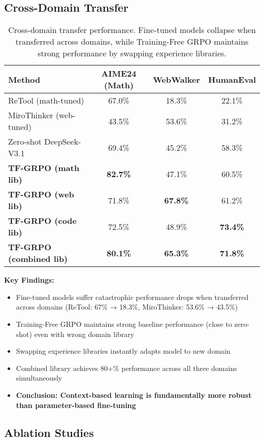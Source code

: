 \documentclass[11pt,a4paper]{article}
\begin{document}
\subsection{Cross-Domain Transfer}
\label{sec:transfer}

\begin{table}[h]
\centering
\caption{Cross-domain transfer performance. Fine-tuned models collapse when transferred across domains, while Training-Free GRPO maintains strong performance by swapping experience libraries.}
\label{tab:transfer}
\begin{tabular}{@{}lccc@{}}
\toprule
\textbf{Method} & \textbf{AIME24 (Math)} & \textbf{WebWalker} & \textbf{HumanEval} \\
\midrule
ReTool (math-tuned) & 67.0\% & 18.3\% & 22.1\% \\
MiroThinker (web-tuned) & 43.5\% & 53.6\% & 31.2\% \\
\midrule
Zero-shot DeepSeek-V3.1 & 69.4\% & 45.2\% & 58.3\% \\
\midrule
\textbf{TF-GRPO (math lib)} & \textbf{82.7\%} & 47.1\% & 60.5\% \\
\textbf{TF-GRPO (web lib)} & 71.8\% & \textbf{67.8\%} & 61.2\% \\
\textbf{TF-GRPO (code lib)} & 72.5\% & 48.9\% & \textbf{73.4\%} \\
\textbf{TF-GRPO (combined lib)} & \textbf{80.1\%} & \textbf{65.3\%} & \textbf{71.8\%} \\
\bottomrule
\end{tabular}
\end{table}

\textbf{Key Findings:}
\begin{itemize}
    \item Fine-tuned models suffer catastrophic performance drops when transferred across domains (ReTool: 67\% → 18.3\%, MiroThinker: 53.6\% → 43.5\%)
    \item Training-Free GRPO maintains strong baseline performance (close to zero-shot) even with wrong domain library
    \item Swapping experience libraries instantly adapts model to new domain
    \item Combined library achieves 80+\% performance across all three domains simultaneously
    \item \textbf{Conclusion: Context-based learning is fundamentally more robust than parameter-based fine-tuning}
\end{itemize}

\subsection{Ablation Studies}
\end{document}
